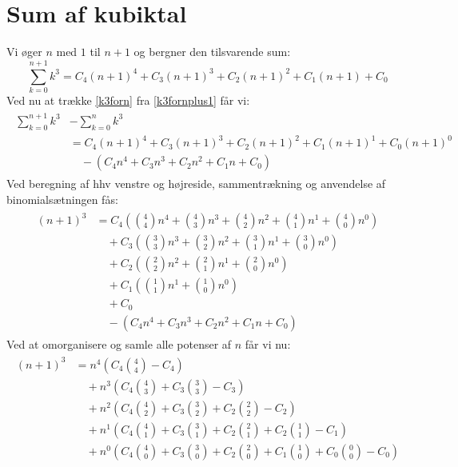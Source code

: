 \section{Sum af kubiktal}
Vi øger \(n\)  med \(1\) til \(n+1\) og bergner den tilsvarende sum:
\begin{equation}
\sum_{k=0}^{n+1}k^3=C_4(n+1)^4+C_3(n+1)^3+C_2(n+1)^2+C_1(n+1)+C_0\label{k3fornplus1}
\end{equation}
Ved nu at trække \ref{k3forn} fra \ref{k3fornplus1} får vi:
\begin{align}
\begin{split}
\sum_{k=0}^{n+1}k^3&-\sum_{k=0}^{n}k^3\\
&=C_4(n+1)^4+C_3(n+1)^3+C_2(n+1)^2+C_1(n+1)^{1}+C_0(n+1)^{0}\\
&\quad-(C_{4}n^4+C_{3}n^3+C_{2}n^2+C_{1}n+C_{0})
\end{split}
\end{align}
Ved beregning af hhv venstre og højreside, sammentrækning og anvendelse af binomialsætningen fås:
\begin{align}
\begin{split}
(n+1)^3&=C_4\left(\binom{4}{4}n^4+\binom{4}{3}n^3+\binom{4}{2}n^2+\binom{4}{1}n^1+\binom{4}{0}n^0\right)\\
&\quad+C_3\left(\binom{3}{3}n^3+\binom{3}{2}n^2+\binom{3}{1}n^1+\binom{3}{0}n^0\right)\\
&\quad+C_2\left(\binom{2}{2}n^2+\binom{2}{1}n^1+\binom{2}{0}n^0\right)\\
&\quad+C_1\left(\binom{1}{1}n^1+\binom{1}{0}n^0\right)\\
&\quad+C_0\\
&\quad-(C_{4}n^4+C_{3}n^3+C_{2}n^2+C_{1}n+C_{0})
\end{split}
\end{align}
Ved at omorganisere og samle alle potenser af \(n\) får vi nu:
\begin{align}
\begin{split}
(n+1)^3&=n^4\left(C_4\binom{4}{4}-C_4\right)\\
&\quad+n^3\left(C_4\binom{4}{3}+C_3\binom{3}{3}-C_3\right)\\
&\quad+n^2\left(C_4\binom{4}{2}+C_3\binom{3}{2}+C_2\binom{2}{2}-C_2\right)\\
&\quad+n^1\left(C_4\binom{4}{1}+C_3\binom{3}{1}+C_2\binom{2}{1}+C_2\binom{1}{1}-C_1\right)\\
&\quad+n^0\left(C_4\binom{4}{0}+C_3\binom{3}{0}+C_2\binom{2}{0}+C_1\binom{1}{0}+C_0\binom{0}{0}-C_0\right)\label{genligning}
\end{split}
\end{align}
